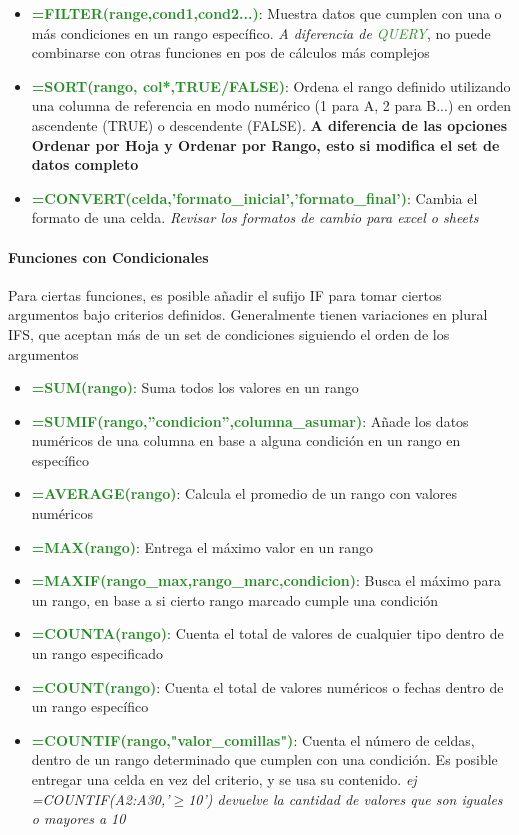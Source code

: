 \begin{itemize}
    \item {\textcolor{ForestGreen}{\textbf{=FILTER(range,cond1,cond2...)}}: Muestra datos que cumplen con una o más condiciones en un rango específico. \textit{A diferencia de \textcolor{ForestGreen}{QUERY}}, no puede combinarse con otras funciones en pos de cálculos más complejos}
    \item {\textcolor{ForestGreen}{\textbf{=SORT(rango, col*,TRUE/FALSE)}}: Ordena el rango definido utilizando una columna de referencia en modo numérico (1 para A, 2 para B...) en orden ascendente (TRUE) o descendente (FALSE). \textbf{A diferencia de las opciones Ordenar por Hoja y Ordenar por Rango, esto si modifica el set de datos completo}}
    \item {\textcolor{ForestGreen}{\textbf{=CONVERT(celda,'formato\_inicial','formato\_final')}}: Cambia el formato de una celda. \textit{Revisar los formatos de cambio para excel o sheets}}
\end{itemize}

\paragraph{Funciones con Condicionales}
Para ciertas funciones, es posible añadir el sufijo IF para tomar ciertos argumentos bajo criterios definidos. Generalmente tienen variaciones en plural IFS, que aceptan más de un set de condiciones siguiendo el orden de los argumentos
\begin{itemize}
    \item{\textcolor{ForestGreen}{\textbf{=SUM(rango)}}: Suma todos los valores en un rango}
    \item {\textcolor{ForestGreen}{\textbf{=SUMIF(rango,''condicion'',columna\_asumar)}}: Añade los datos numéricos de una columna en base a alguna condición en un rango en específico}
    \item {\textcolor{ForestGreen}{\textbf{=AVERAGE(rango)}}: Calcula el promedio de un rango con valores numéricos}
    \item {\textcolor{ForestGreen}{\textbf{=MAX(rango)}}: Entrega el máximo valor en un rango}
    \item {\textcolor{ForestGreen}{\textbf{=MAXIF(rango\_max,rango\_marc,condicion)}}: Busca el máximo para un rango, en base a si cierto rango marcado cumple una condición}
    \item {\textcolor{ForestGreen}{\textbf{=COUNTA(rango)}}: Cuenta el total de valores de cualquier tipo dentro de un rango especificado}
    \item {\textcolor{ForestGreen}{\textbf{=COUNT(rango)}}: Cuenta el total de valores numéricos o fechas dentro de un rango específico}
    \item {\textcolor{ForestGreen}{\textbf{=COUNTIF(rango,"valor\_comillas")}}: Cuenta el número de celdas, dentro de un rango determinado que cumplen con una condición. Es posible entregar una celda en vez del criterio, y se usa su contenido. \textit{ej =COUNTIF(A2:A30,'${\geq}$10') devuelve la cantidad de valores que son iguales o mayores a 10}}
    
    
\end{itemize}

